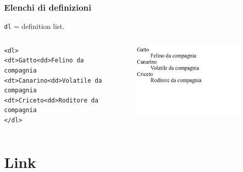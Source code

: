 \documentclass[]{beamer}
\begin{document}
\begin{frame}[fragile]
\frametitle{Elenchi di definizioni}
\texttt{dl} = definition list.
\begin{columns}
\begin{column}{0.45\textwidth}
\begin{scriptsize}
\begin{verbatim}
<dl>
<dt>Gatto<dd>Felino da compagnia
<dt>Canarino<dd>Volatile da compagnia
<dt>Criceto<dd>Roditore da compagnia
</dl>
\end{verbatim}
\end{scriptsize}
\end{column}
\begin{column}{0.45\textwidth}
\begin{figure}
\includegraphics[width=0.8\columnwidth]{screenshots/definizioni.png}
\end{figure}
\end{column}
\end{columns}
\end{frame}


\section{Link}
\end{document}
